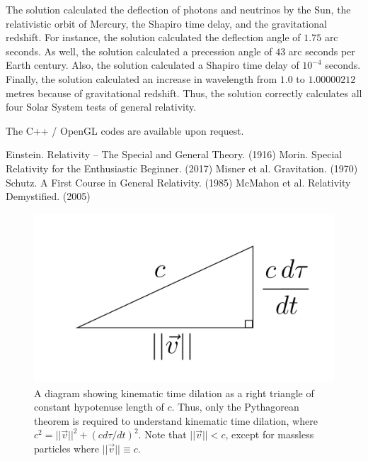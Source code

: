 \documentclass[12pt]{article}
\begin{document}
The solution calculated the deflection of photons and neutrinos by the Sun, the relativistic orbit of Mercury, the Shapiro time delay, and the gravitational redshift.
For instance, the solution calculated the deflection angle of $1.75$ arc seconds.
As well, the solution calculated a precession angle of $43$ arc seconds per Earth century.
Also, the solution calculated a Shapiro time delay of $10^{-4}$ seconds.
Finally, the solution calculated an increase in wavelength from $1.0$ to $1.00000212$ metres because of gravitational redshift.
Thus, the solution correctly calculates all four Solar System tests of general relativity.

The C++ / OpenGL codes are available upon request.






\begin{thebibliography}{9}


 Einstein. Relativity -- The Special and General Theory. (1916)
 Morin. Special Relativity for the Enthusiastic Beginner. (2017)
 Misner et al. Gravitation. (1970)
 Schutz. A First Course in General Relativity. (1985)
 McMahon et al. Relativity Demystified. (2005)

\end{thebibliography}










\begin{figure} 
\centering
\label{fig1}
  \includegraphics[width = 6 in]{kinematic_time_dilation.png}
  \caption{ A diagram showing kinematic time dilation as a right triangle of constant hypotenuse length of $c$.
Thus, only the Pythagorean theorem is required to understand kinematic time dilation, where $c^2 = \lvert\lvert \vec{v}\rvert\rvert^2 + (c d\tau/dt)^2 $.
Note that $\lvert\lvert \vec{v}\rvert\rvert < c$, except for massless particles where $\lvert\lvert \vec{v}\rvert\rvert \equiv c$.
}
\end{figure}
\end{document}

